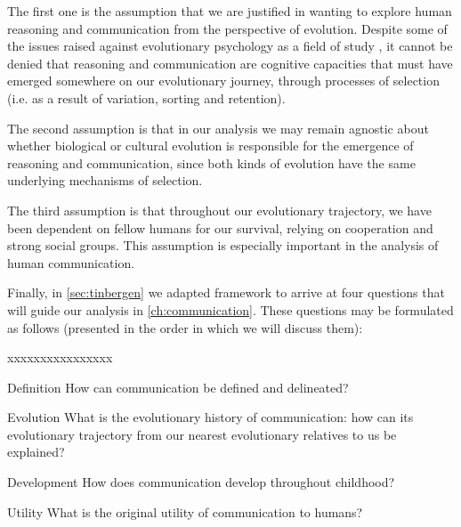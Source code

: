 The first one is the assumption that we are justified in wanting to explore human reasoning and communication from the perspective of evolution. Despite some of the issues raised against evolutionary psychology as a field of study \citep{LB02}, it cannot be denied that reasoning and communication are cognitive capacities that must have emerged somewhere on our evolutionary journey, through processes of selection (i.e. as a result of variation, sorting and retention).

The second assumption is that in our analysis we may remain agnostic about whether biological or cultural evolution is responsible for the emergence of reasoning and communication, since both kinds of evolution have the same underlying mechanisms of selection.


The third assumption is that throughout our evolutionary trajectory, we have been dependent on fellow humans for our survival, relying on cooperation and strong social groups. This assumption is especially important in the analysis of human communication.

Finally, in \cref{sec:tinbergen} we adapted  framework to arrive at four questions that will guide our analysis in \cref{ch:communication}. These questions may be formulated as follows (presented in the order in which we will discuss them):

\begin{labeling}{xxxxxxxxxxxxxxxx}
    \item [Definition] How can communication be defined and delineated?
    \item [Evolution] What is the evolutionary history of communication: how can its evolutionary trajectory from our nearest evolutionary relatives to us be explained?
    \item [Development] How does communication develop throughout childhood?
    \item [Utility] What is the original utility of communication to humans?
\end{labeling}

